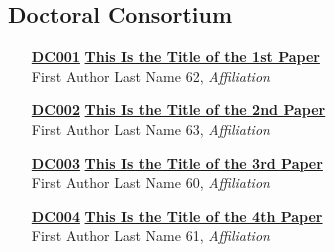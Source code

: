 \subsection{Doctoral Consortium}
\begin{enumerate}
\item[\href{https://doi.org/10.1145/1122445.1122456}{\textbf{DC001}}]
\href{https://doi.org/10.1145/1122445.1122456}{\textbf{This Is the Title of the 1st Paper}}\\
First Author Last Name 62, \emph{Affiliation}\\

\item[\href{https://doi.org/10.1145/1122445.1122456}{\textbf{DC002}}]
\href{https://doi.org/10.1145/1122445.1122456}{\textbf{This Is the Title of the 2nd Paper}}\\
First Author Last Name 63, \emph{Affiliation}\\

\item[\href{https://doi.org/10.1145/1122445.1122456}{\textbf{DC003}}]
\href{https://doi.org/10.1145/1122445.1122456}{\textbf{This Is the Title of the 3rd Paper}}\\
First Author Last Name 60, \emph{Affiliation}\\

\item[\href{https://doi.org/10.1145/1122445.1122456}{\textbf{DC004}}]
\href{https://doi.org/10.1145/1122445.1122456}{\textbf{This Is the Title of the 4th Paper}}\\
First Author Last Name 61, \emph{Affiliation}\\
\end{enumerate}


